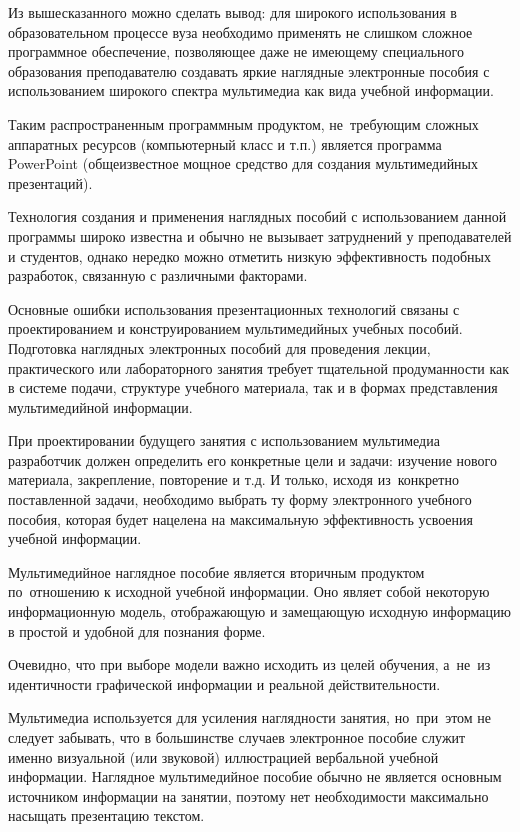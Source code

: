 \documentclass{ou}
\begin{document}
Из вышесказанного можно сделать вывод: для широкого использования в образовательном процессе вуза необходимо применять не слишком сложное программное обеспечение, позволяющее даже не имеющему специального образования преподавателю создавать яркие наглядные электронные пособия с использованием широкого спектра мультимедиа как вида учебной информации.

Таким распространенным программным продуктом, не~требующим сложных аппаратных ресурсов (компьютерный класс и т.п.) является программа PowerPoint (общеизвестное мощное средство для создания мультимедийных презентаций).

Технология создания и применения наглядных пособий с использованием данной программы широко известна и обычно не вызывает затруднений у преподавателей и студентов, однако нередко можно отметить низкую эффективность подобных разработок, связанную с различными факторами.

Основные ошибки использования презентационных технологий связаны с проектированием и конструированием мультимедийных учебных пособий. Подготовка наглядных электронных пособий для проведения лекции, практического или лабораторного занятия требует тщательной продуманности как в системе подачи, структуре учебного материала, так и в формах представления мультимедийной информации.

При проектировании будущего занятия с использованием мультимедиа разработчик должен определить его конкретные цели и задачи: изучение нового материала, закрепление, повторение и т.д. И только, исходя из~конкретно поставленной задачи, необходимо выбрать ту форму электронного учебного пособия, которая будет нацелена на максимальную эффективность усвоения учебной информации.

Мультимедийное наглядное пособие является вторичным продуктом по~отношению к исходной учебной информации. Оно являет собой некоторую информационную модель, отображающую и замещающую исходную информацию в простой и удобной для познания форме. 

Очевидно, что при выборе модели важно исходить из целей обучения, а~не~из идентичности графической информации и реальной действительности.

Мультимедиа используется для усиления наглядности занятия, но~при~этом не следует забывать, что в большинстве случаев электронное пособие служит именно визуальной (или звуковой) иллюстрацией вербальной учебной информации. Наглядное мультимедийное пособие обычно не является основным источником информации на занятии, поэтому нет необходимости максимально насыщать презентацию текстом.
\end{document}
